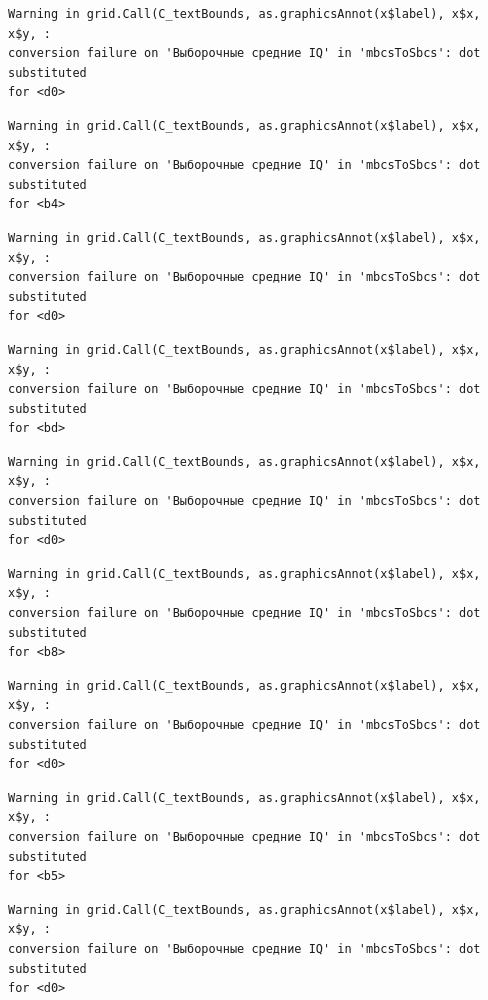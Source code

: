 \documentclass[
  letterpaper,
  DIV=11,
  numbers=noendperiod]{scrreprt}
\theoremstyle{definition}
\theoremstyle{remark}
\begin{document}
\begin{verbatim}
Warning in grid.Call(C_textBounds, as.graphicsAnnot(x$label), x$x, x$y, :
conversion failure on 'Выборочные средние IQ' in 'mbcsToSbcs': dot substituted
for <d0>
\end{verbatim}

\begin{verbatim}
Warning in grid.Call(C_textBounds, as.graphicsAnnot(x$label), x$x, x$y, :
conversion failure on 'Выборочные средние IQ' in 'mbcsToSbcs': dot substituted
for <b4>
\end{verbatim}

\begin{verbatim}
Warning in grid.Call(C_textBounds, as.graphicsAnnot(x$label), x$x, x$y, :
conversion failure on 'Выборочные средние IQ' in 'mbcsToSbcs': dot substituted
for <d0>
\end{verbatim}

\begin{verbatim}
Warning in grid.Call(C_textBounds, as.graphicsAnnot(x$label), x$x, x$y, :
conversion failure on 'Выборочные средние IQ' in 'mbcsToSbcs': dot substituted
for <bd>
\end{verbatim}

\begin{verbatim}
Warning in grid.Call(C_textBounds, as.graphicsAnnot(x$label), x$x, x$y, :
conversion failure on 'Выборочные средние IQ' in 'mbcsToSbcs': dot substituted
for <d0>
\end{verbatim}

\begin{verbatim}
Warning in grid.Call(C_textBounds, as.graphicsAnnot(x$label), x$x, x$y, :
conversion failure on 'Выборочные средние IQ' in 'mbcsToSbcs': dot substituted
for <b8>
\end{verbatim}

\begin{verbatim}
Warning in grid.Call(C_textBounds, as.graphicsAnnot(x$label), x$x, x$y, :
conversion failure on 'Выборочные средние IQ' in 'mbcsToSbcs': dot substituted
for <d0>
\end{verbatim}

\begin{verbatim}
Warning in grid.Call(C_textBounds, as.graphicsAnnot(x$label), x$x, x$y, :
conversion failure on 'Выборочные средние IQ' in 'mbcsToSbcs': dot substituted
for <b5>
\end{verbatim}

\begin{verbatim}
Warning in grid.Call(C_textBounds, as.graphicsAnnot(x$label), x$x, x$y, :
conversion failure on 'Выборочные средние IQ' in 'mbcsToSbcs': dot substituted
for <d0>
\end{verbatim}
\end{document}
